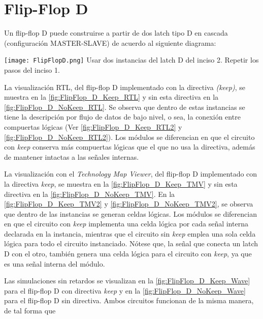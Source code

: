 \section{Flip-Flop D \label{sec:s3}}

\begin{center}
	\begin{minipage}{12cm}
		\begin{tcolorbox}[title=Actividad 3]
			 Un flip-flop D puede construirse a partir de dos latch tipo D en cascada (configuración MASTER-SLAVE) de acuerdo al siguiente diagrama:\enter
			 
			 \texttt{[image: FlipFlopD.png]}
			 Usar dos instancias del latch D del inciso 2. Repetir los pasos del inciso 1.
		\end{tcolorbox}	
	\end{minipage}
\end{center}

La visualización RTL, del flip-flop D implementado con la directiva \textit{(keep)}, se muestra en la \autoref{fig:FlipFlop_D_Keep_RTL} y sin esta directiva en la \autoref{fig:FlipFlop_D_NoKeep_RTL}. Se observa que dentro de estas instancias se tiene la descripción por flujo de datos de bajo nivel, o sea, la conexión entre compuertas lógicas (Ver \autoref{fig:FlipFlop_D_Keep_RTL2} y \autoref{fig:FlipFlop_D_NoKeep_RTL2}). Los módulos se diferencian en que el circuito con \textit{keep} conserva más compuertas lógicas que el que no usa la directiva, además de mantener intactas a las señales internas.

La visualización con el \textit{Technology Map Viewer}, del flip-flop D implementado con la directiva \textit{keep}, se muestra en la \autoref{fig:FlipFlop_D_Keep_TMV} y sin esta directiva en la \autoref{fig:FlipFlop_D_NoKeep_TMV}. En la \autoref{fig:FlipFlop_D_Keep_TMV2} y \autoref{fig:FlipFlop_D_NoKeep_TMV2}, se observa que dentro de las instancias se generan celdas lógicas. Los módulos se diferencian en que el circuito con \textit{keep} implementa una celda lógica por cada señal interna declarada en la instancia, mientras que el circuito sin \textit{keep} emplea una sola celda lógica para todo el circuito instanciado. Nótese que, la señal que conecta un latch D con el otro, también genera una celda lógica para el circuito con \textit{keep}, ya que es una señal interna del módulo.

Las simulaciones sin retardos se visualizan en la \autoref{fig:FlipFlop_D_Keep_Wave} para el flip-flop D con directiva \textit{keep} y en la \autoref{fig:FlipFlop_D_NoKeep_Wave} para el flip-flop D sin directiva. Ambos circuitos funcionan de la misma manera, de tal forma que 

